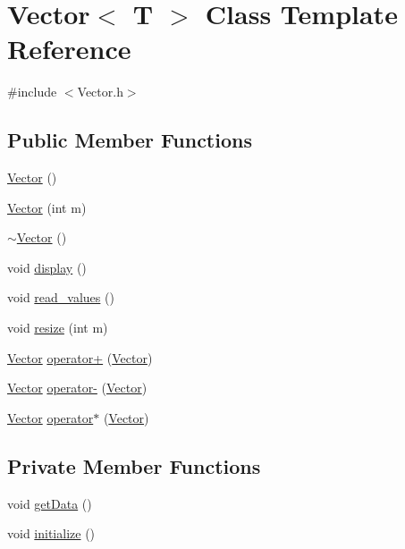 \hypertarget{class_vector}{}\section{Vector$<$ T $>$ Class Template Reference}
\label{class_vector}


{\ttfamily \#include $<$Vector.\+h$>$}

\subsection*{Public Member Functions}
\begin{DoxyCompactItemize}
\item 
\hyperlink{class_vector_a39d6069675db4ecfc1ab81d440da759a}{Vector} ()
\item 
\hyperlink{class_vector_a7233eaf600bca59dbd1a195ccb465cf5}{Vector} (int m)
\item 
\hyperlink{class_vector_aadd88501ee4d48b6da9fa12530373b63}{$\sim$\+Vector} ()
\item 
void \hyperlink{class_vector_af8fbb7be7e884bbd38fd619f791a493b}{display} ()
\item 
void \hyperlink{class_vector_a0506141fb83169539d9b50c035a4c375}{read\+\_\+values} ()
\item 
void \hyperlink{class_vector_ad3e66cc314446ce3418ef8792fdc3b5d}{resize} (int m)
\item 
\hyperlink{class_vector}{Vector} \hyperlink{class_vector_adff1dcd77fb11ac6c75ee0e801e5d75e}{operator+} (\hyperlink{class_vector}{Vector})
\item 
\hyperlink{class_vector}{Vector} \hyperlink{class_vector_af43adb2f0f503c4a017e61b0647eeb89}{operator-\/} (\hyperlink{class_vector}{Vector})
\item 
\hyperlink{class_vector}{Vector} \hyperlink{class_vector_aadd70d871fdbc9053fd236799af06a8a}{operator$\ast$} (\hyperlink{class_vector}{Vector})
\end{DoxyCompactItemize}
\subsection*{Private Member Functions}
\begin{DoxyCompactItemize}
\item 
void \hyperlink{class_vector_a5cdce317c4c74592fcb64fd3dde6ce49}{get\+Data} ()
\item 
void \hyperlink{class_vector_ac82088c9d33b959876efd77dbc46e2fd}{initialize} ()
\end{DoxyCompactItemize}
